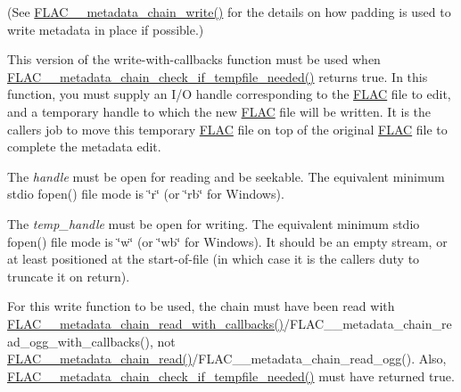 (See \hyperlink{group__flac__metadata__level2_gaa15ead7230217de8e79f4af822cda490}{F\+L\+A\+C\+\_\+\+\_\+metadata\+\_\+chain\+\_\+write()} for the details on how padding is used to write metadata in place if possible.)

This version of the write-\/with-\/callbacks function must be used when \hyperlink{group__flac__metadata__level2_ga29a124cceaffce5376d073a032bd1c52}{F\+L\+A\+C\+\_\+\+\_\+metadata\+\_\+chain\+\_\+check\+\_\+if\+\_\+tempfile\+\_\+needed()} returns true. In this function, you must supply an I/O handle corresponding to the \hyperlink{namespace_f_l_a_c}{F\+L\+AC} file to edit, and a temporary handle to which the new \hyperlink{namespace_f_l_a_c}{F\+L\+AC} file will be written. It is the caller\textquotesingle{}s job to move this temporary \hyperlink{namespace_f_l_a_c}{F\+L\+AC} file on top of the original \hyperlink{namespace_f_l_a_c}{F\+L\+AC} file to complete the metadata edit.

The {\itshape handle} must be open for reading and be seekable. The equivalent minimum stdio fopen() file mode is {\ttfamily \char`\"{}r\char`\"{}} (or {\ttfamily \char`\"{}rb\char`\"{}} for Windows).

The {\itshape temp\+\_\+handle} must be open for writing. The equivalent minimum stdio fopen() file mode is {\ttfamily \char`\"{}w\char`\"{}} (or {\ttfamily \char`\"{}wb\char`\"{}} for Windows). It should be an empty stream, or at least positioned at the start-\/of-\/file (in which case it is the caller\textquotesingle{}s duty to truncate it on return).

For this write function to be used, the chain must have been read with \hyperlink{group__flac__metadata__level2_ga061ae21b7836cd26f13345b897f05f3e}{F\+L\+A\+C\+\_\+\+\_\+metadata\+\_\+chain\+\_\+read\+\_\+with\+\_\+callbacks()}/\+F\+L\+A\+C\+\_\+\+\_\+metadata\+\_\+chain\+\_\+read\+\_\+ogg\+\_\+with\+\_\+callbacks(), not \hyperlink{group__flac__metadata__level2_gadb7d8e9a82aeb43e256f0a948adf5c45}{F\+L\+A\+C\+\_\+\+\_\+metadata\+\_\+chain\+\_\+read()}/\+F\+L\+A\+C\+\_\+\+\_\+metadata\+\_\+chain\+\_\+read\+\_\+ogg(). Also, \hyperlink{group__flac__metadata__level2_ga29a124cceaffce5376d073a032bd1c52}{F\+L\+A\+C\+\_\+\+\_\+metadata\+\_\+chain\+\_\+check\+\_\+if\+\_\+tempfile\+\_\+needed()} must have returned {\ttfamily true}.


